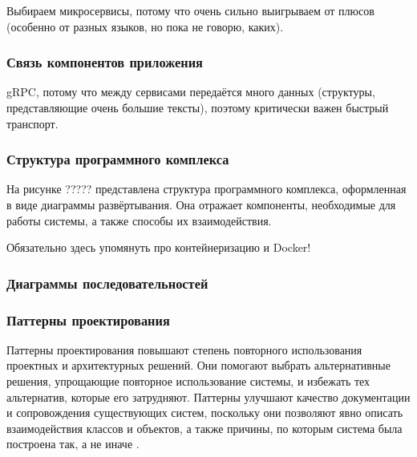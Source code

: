 Выбираем микросервисы, потому что очень сильно выигрываем от плюсов (особенно от разных языков, но пока не говорю, каких).



\subsubsection{Связь компонентов приложения}




gRPC, потому что между сервисами передаётся много данных (структуры, представляющие очень большие тексты), поэтому критически важен быстрый транспорт.



\subsubsection{Структура программного комплекса}

На рисунке ????? представлена структура программного комплекса, оформленная в виде диаграммы развёртывания. Она отражает компоненты, необходимые для работы системы, а также способы их взаимодействия. 

Обязательно здесь упомянуть про контейнеризацию и Docker!



\subsubsection{Диаграммы последовательностей}



\subsubsection{Паттерны проектирования}

Паттерны проектирования повышают степень повторного использования проектных и архитектурных решений. Они помогают выбрать альтернативные решения, упрощающие повторное использование системы, и избежать тех альтернатив, которые его затрудняют. Паттерны улучшают качество документации и сопровождения существующих систем, поскольку они позволяют явно описать взаимодействия классов и объектов, а также причины, по которым система была построена так, а не иначе \cite{patterns}.

